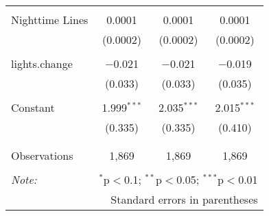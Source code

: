 \begin{table}[!htbp]
\begin{tabular}{@{\extracolsep{5pt}}lccc}
  & & & \\ 
 Nighttime Lines & 0.0001 & 0.0001 & 0.0001 \\ 
  & (0.0002) & (0.0002) & (0.0002) \\ 
  & & & \\ 
 lights.change & $-$0.021 & $-$0.021 & $-$0.019 \\ 
  & (0.033) & (0.033) & (0.035) \\ 
  & & & \\ 
 Constant & 1.999$^{***}$ & 2.035$^{***}$ & 2.015$^{***}$ \\ 
  & (0.335) & (0.335) & (0.410) \\ 
  & & & \\ 
\hline \\[-1.8ex] 
Observations & 1,869 & 1,869 & 1,869 \\ 
\hline 
\hline \\[-1.8ex] 
\textit{Note:}  & \multicolumn{3}{r}{$^{*}$p$<$0.1; $^{**}$p$<$0.05; $^{***}$p$<$0.01} \\ 
 & \multicolumn{3}{r}{Standard errors in parentheses} \\ 
\end{tabular} 
\end{table} 
